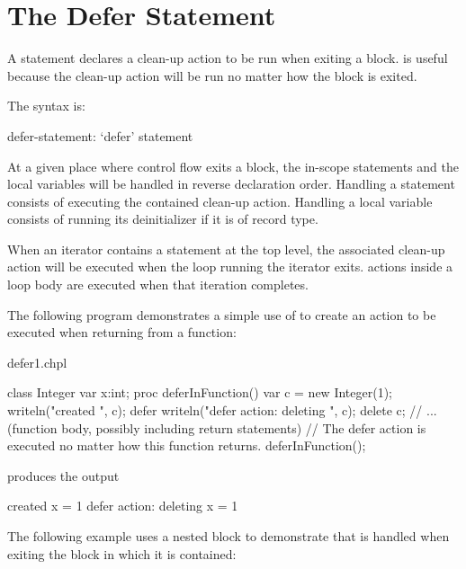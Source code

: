 \section{The Defer Statement}
\label{The_Defer_Statement}

A  statement declares a clean-up action to be run when
exiting a block.
 is useful because the clean-up action will be run no
matter how the block is exited.

The syntax is:

\begin{syntax}
defer-statement:
  `defer' statement
\end{syntax}

At a given place where control flow exits a block, the in-scope
 statements and the local variables will be handled in
reverse declaration order. Handling a  statement consists of
executing the contained clean-up action. Handling a local variable
consists of running its deinitializer if it is of record type.

When an iterator contains a  statement at the top level, the
associated clean-up action will be executed when the loop running the
iterator exits.  actions inside a loop body are executed
when that iteration completes.

The following program demonstrates a simple use of 
to create an action to be executed when returning from a function:

\begin{chapelexample}{defer1.chpl}
\begin{chapel}
class Integer {
  var x:int;
}
proc deferInFunction() {
  var c = new Integer(1);
  writeln("created ", c);
  defer {
    writeln("defer action: deleting ", c);
    delete c;
  }
  // ... (function body, possibly including return statements)
  // The defer action is executed no matter how this function returns.
}
deferInFunction();
\end{chapel}
produces the output
\begin{chapelprintoutput}{}
created {x = 1}
defer action: deleting {x = 1}
\end{chapelprintoutput}
\end{chapelexample}


The following example uses a nested block to demonstrate that 
is handled when exiting the block in which it is contained:


